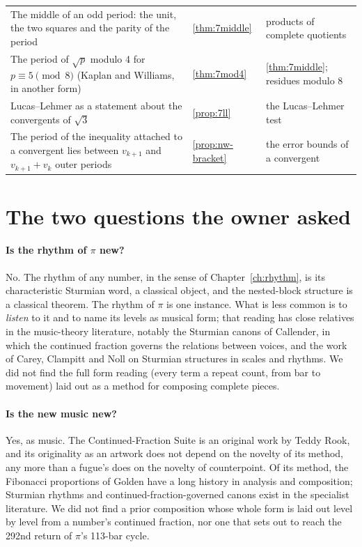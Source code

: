 {\begin{longtable}{@{}>{\raggedright\arraybackslash}p{}>{\raggedright\arraybackslash}p{}>{\raggedright\arraybackslash}p{}@{}}
The middle of an odd period: the unit, the two squares and the parity of the period \addedon{\revG} & \cref{thm:7middle} & products of complete quotients \\
The period of $\sqrt p$ modulo 4 for $p \equiv 5 \pmod 8$ (Kaplan and Williams, in another form) \addedon{\revG} & \cref{thm:7mod4} & \cref{thm:7middle}; residues modulo 8 \\
Lucas--Lehmer as a statement about the convergents of $\sqrt 3$ \addedon{\revG} & \cref{prop:7ll} & the Lucas--Lehmer test \citep{ConradLL} \\
The period of the inequality attached to a convergent lies between $v_{k+1}$ and $v_{k+1} + v_k$ outer periods \addedon{\revF} & \cref{prop:nw-bracket} & the error bounds of a convergent \\
\end{longtable}}

\section{The two questions the owner asked}

\paragraph{Is the rhythm of $\pi$ new?} No. The rhythm of any number, in the sense of Chapter~\ref{ch:rhythm}, is its characteristic Sturmian word, a classical object, and the nested-block structure is a classical theorem. The rhythm of $\pi$ is one instance. What is less common is to \emph{listen} to it and to name its levels as musical form; that reading has close relatives in the music-theory literature, notably the Sturmian canons of Callender, in which the continued fraction governs the relations between voices, and the work of Carey, Clampitt and Noll on Sturmian structures in scales and rhythms. We did not find the full form reading (every term a repeat count, from bar to movement) laid out as a method for composing complete pieces.

\paragraph{Is the new music new?} Yes, as music. The Continued-Fraction Suite is an original work by Teddy Rook, and its originality as an artwork does not depend on the novelty of its method, any more than a fugue's does on the novelty of counterpoint. Of its method, the Fibonacci proportions of Golden have a long history in analysis and composition; Sturmian rhythms and continued-fraction-governed canons exist in the specialist literature. We did not find a prior composition whose whole form is laid out level by level from a number's continued fraction, nor one that sets out to reach the 292nd return of $\pi$'s 113-bar cycle.

